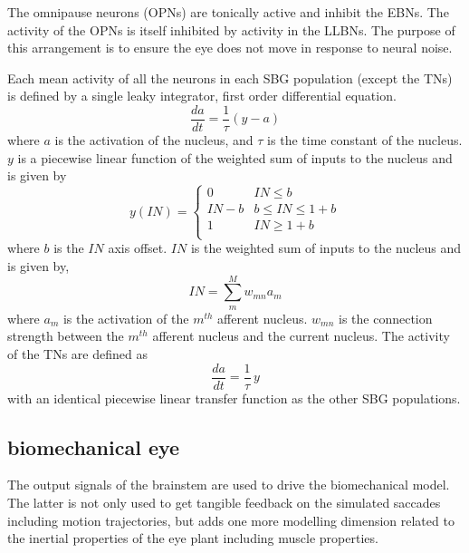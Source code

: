 \documentclass{frontiersSCNS}
\begin{document}
The omnipause neurons (OPNs) are tonically active and inhibit the
EBNs.  The activity of the OPNs is itself inhibited by activity in the
LLBNs.  The purpose of this arrangement is to ensure the eye does not
move in response to neural noise.

Each mean activity of all the neurons in each SBG population (except
the TNs) is defined by a single leaky integrator, first order
differential equation.
\begin{equation}\label{eq:LIN}
   \frac{da}{dt} = \frac{1}{\tau}(y-a)
\end{equation}
where $a$ is the activation of the nucleus, and $\tau$ is the time
constant of the nucleus. $y$ is a piecewise linear function of the
weighted sum of inputs to the nucleus and is given by
\begin{equation}
       y(IN) = \begin{cases}
       0    & IN \leq b \\
      IN-b   & b \leq IN \leq 1+b \\
      1   & IN \geq 1+b \\
   \end{cases}
\end{equation}
where $b$ is the $IN$ axis offset.  $IN$ is the weighted sum of inputs
to the nucleus and is given by,
\begin{equation}
    IN = \sum_{m}^{M} w_{mn} a_{m}
\end{equation}
where $a_{m}$ is the activation of the $m^{th}$ afferent nucleus.
$w_{mn}$ is the connection strength between the $m^{th}$ afferent
nucleus and the current nucleus. The activity of the TNs are defined
as
\begin{equation}
   \frac{da}{dt} = \frac{1}{\tau}\,y
\end{equation}
with an identical piecewise linear transfer function as the other SBG
populations.

\subsection{biomechanical eye}

The output signals of the brainstem are used to drive the
biomechanical model.  The latter is not only used to get tangible
feedback on the simulated saccades including motion trajectories, but
adds one more modelling dimension related to the inertial properties
of the eye plant including muscle properties.
\end{document}

